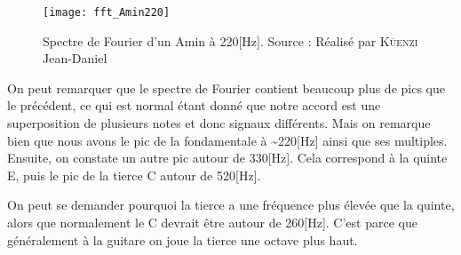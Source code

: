 \begin{figure}[H]
	\centering
	\texttt{[image: fft\_Amin220]}
	\caption[Spectre de Fourier d'un Amin à 220 Hertz]{Spectre de Fourier d'un Amin à 220[Hz]. Source : Réalisé par \textsc{Küenzi} Jean-Daniel}
	\label{fig:fft_amin220}
\end{figure}

On peut remarquer que le spectre de Fourier contient beaucoup plus de pics que le précédent, ce qui est normal étant donné que notre accord est une superposition de plusieurs notes et donc signaux différents. Mais on remarque bien que nous avons le pic de la fondamentale à \textasciitilde220[Hz] ainsi que ses multiples. Ensuite, on constate un autre pic autour de 330[Hz]. Cela correspond à la quinte E, puis le pic de la tierce C autour de 520[Hz].

On peut se demander pourquoi la tierce a une fréquence plus élevée que la quinte, alors que normalement le C devrait être autour de 260[Hz]. C'est parce que généralement à la guitare on joue la tierce une octave plus haut.
